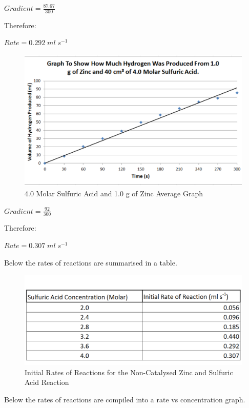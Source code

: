 $Gradient = \frac{87.67}{300}$

Therefore:

$Rate = 0.292 \; ml \; s^{-1}$

\begin{figure}[H]
    \includegraphics[width=\textwidth]{./Analysis/Images/1NonCatalyst/40Molar.pdf}
    \caption{4.0 Molar Sulfuric Acid and 1.0 g of Zinc Average Graph} \label{fig:40MolarSAGradient}
\end{figure}

$Gradient = \frac{92}{300}$

Therefore:

$Rate = 0.307 \; ml \; s^{-1}$

Below the rates of reactions are summarised in a table.

\begin{figure}[H]
    \includegraphics[width=\textwidth]{./Analysis/Images/1NonCatalyst/Rates.pdf}
    \caption{Initial Rates of Reactions for the Non-Catalysed Zinc and Sulfuric Acid Reaction} \label{fig:RatesSA}
\end{figure}

Below the rates of reactions are compiled into a rate vs concentration graph.

